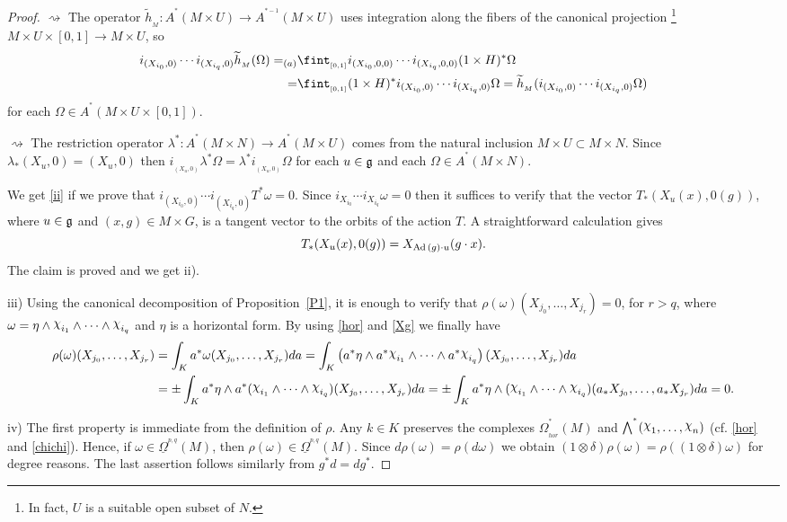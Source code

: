 \documentclass[a4paper,oneside,10pt,reqno]{amsart}
\theoremstyle{definition}
\newcommand{\propref}[1]{Proposition~\ref{#1}}
\newcommand\negro{\normalcolor}
\newcommand{\wt}{\widetilde}
\newcommand{\g}{\noindent {\mathfrak{g}}}
\newcommand{\Ad}{\mathop{\rm Ad \, } \nolimits}
\newcommand\chii{\raise2pt\hbox{$\chi$}}
\newcommand\Om{\Omega}
\newcommand\BOm{\underline\Omega}
\newcommand\om{\omega}
\newcommand{\id}{{\large 1}}
\newcommand{\bi}[2]{{#1}^{^{#2}}}
\newcommand{\ib}[2]{{#1}_{_{#2}}}
\newcommand{\lau}[4]{{#1}^{^{#2}}_{_{#3}}{\left( #4 \right)}}
\newcommand{\coho}[3]{{#1}^{^{#2}}{\left( #3 \right)}}
\begin{document}
\begin{proof}
  $  \rightsquigarrow$  The operator $\ib{\wt{h}}{M}\colon \coho A * {M\times U} \to \coho  A {*-1} {M\times U} $ uses integration  along
the fibers of the canonical projection
 \footnote{In fact, $U$ is a suitable open subset of $N$.} 
 $M \times  U \times [0,1] \to M \times U$, so
\begin{align*}
i_{(X_{i_0},0)} \cdots i_{(X_{i_q},0)}\ib{\wt{h}}{M}(\Om)=_{(a)}&
\ib{\fint}{[0,1]} 
i_{(X_{i_0},0,0)} \cdots i_{(X_{i_q},0,0)}
(\id\times H)^*\Om \\
= & \ib{\fint}{[0,1]}(\id \times H)^* i_{(X_{i_0},0)} \cdots i_{(X_{i_q},0)}\Om  
= \ib{\wt{h}}{M}(i_{(X_{i_0},0)} \cdots i_{(X_{i_q},0)}\Om)
\end{align*}
for each $\Om \in \coho A* {M\times U\times [0,1]}$.


$  \rightsquigarrow$   The restriction operator $\lambda^*\colon \coho A * { M\times N} \to \coho  A {*} {M \times U}$ comes from the natural inclusion 
$M\times U \subset M \times N$.
Since $\lambda_* (X_u,0) = (X_u,0)$ then $\ib{i}{(X_u,0)}\lambda^* \Omega = \lambda^* \ib{i}{(X_u,0)}\Omega$ for each $u \in \g$ and each $\Om \in \coho A*{ M \times N}$.

\medskip

We get \eqref{ii} if we prove that $i_{(X_{i_0},0)} \cdots i_{(X_{i_q},0)} T^*\om=0$. Since $i_{X_{i_0}} \cdots i_{X_{i_q}} \om=0$ then it suffices to verify that the vector $T_* (X_u(x),0(g))$, where $u\in \g$ and $(x,g)\in M\times G$, is a tangent vector to the orbits of the action $T$.
A straightforward calculation gives
$$
T_* (X_u(x),0(g)) = X_{\Ad(g)\cdot u}(g\cdot x).
$$
The claim is proved and we get ii).

iii)  Using the canonical decomposition of \propref{P1}, it is enough to verify that $ \rho(\om )  (X_{j_0}, \ldots, X_{j_r})=0$, for $r > q$,  where $\om = \eta \wedge \chii_{i_1} \wedge \cdots \wedge \chii_{i_q}$ and $\eta$ is a horizontal form. 
By using \eqref{hor} and \eqref{Xg} we finally have
\begin{align*}
\rho(\om )  (X_{j_0}, \ldots, X_{j_r})&= \int_K a^* \om  (X_{j_0}, \ldots, X_{j_r}) da =
 \int_K    \left(a^* \eta \wedge a^* \chii_{i_1} \wedge \cdots \wedge a^* \chii_{i_q}\right) (X_{j_0}, \ldots, X_{j_r})da
 \\ &=
\pm \int_K  a^* \eta \wedge a^*  ( \chii_{i_1} \wedge \cdots \wedge \chii_{i_q})  (X_{j_0}, \ldots, X_{j_r})da =
\pm \int_K  a^* \eta \wedge ( \chii_{i_1} \wedge \cdots \wedge  \chii_{i_q})  (a_*X_{j_0}, \ldots, a_*X_{j_r})da
 = 0.  
\end{align*}
 \negro



  iv) The first property is immediate from the definition of $\rho$. Any $k\in K$ preserves the  complexes $\lau \Om * {hor}{M}$ and  $\bi \bigwedge * (\chii_1, \ldots,\chii_n)$ (cf. \eqref{hor} and \eqref{chichi}). Hence, if $\omega \in \coho \BOm {p,q} M$, then $\rho(\omega) \in \coho \BOm {p,q} M$.
Since $d\rho (\omega) = \rho (d\omega)$ we obtain $(1\otimes \delta) \rho (\omega) = \rho ((1\otimes \delta)\omega)$ for degree reasons. The last assertion follows similarly from  $g^* d = d g^*$.
\end{proof}
\end{document}
